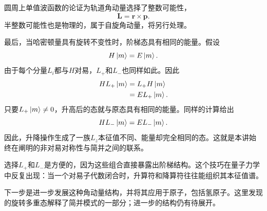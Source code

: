 圆周上单值波函数的论证为轨道角动量选择了整数可能性，
\begin{equation}
\mathbf L=\mathbf r\times\mathbf p.
\end{equation}
半整数可能性也是物理的，属于自旋角动量，将另行处理。

最后，当哈密顿量具有旋转不变性时，阶梯态具有相同的能量。假设
\begin{equation}
H\left\lvert m\right\rangle=E\left\lvert m\right\rangle.
\end{equation}
由于每个分量\(L_i\)都与\(H\)对易，\(L_+\)和\(L_-\)也同样如此。因此
\begin{align}
H L_+\left\lvert m\right\rangle
&=L_+H\left\lvert m\right\rangle\\
&=E L_+\left\lvert m\right\rangle.
\end{align}
只要\(L_+\left\lvert m\right\rangle\neq0\)，升高后的态就与原态具有相同的能量。同样的计算给出
\begin{equation}
H L_-\left\lvert m\right\rangle=E L_-\left\lvert m\right\rangle.
\end{equation}
因此，升降操作生成了一族\(L_z\)本征值不同、能量却完全相同的态。这就是本讲始终在阐明的非对易对称性与简并之间的联系。

\begin{classroomqa}
\end{classroomqa}

选择\(L_+\)和\(L_-\)是方便的，因为这些组合直接暴露出阶梯结构。这个技巧在量子力学中反复出现：当一个对易子代数闭合时，升算符和降算符往往能组织其本征值谱。

\begin{classroomqa}
\end{classroomqa}

下一步是进一步发展这种角动量结构，并将其应用于原子，包括氢原子。这里发现的旋转多重态解释了简并模式的一部分；进一步的结构仍有待展开。
